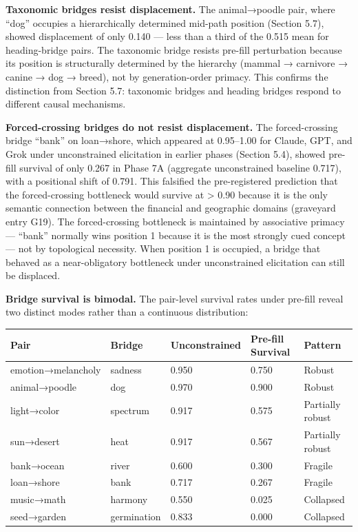 \textbf{Taxonomic bridges resist displacement.} The animal→poodle pair, where ``dog'' occupies a hierarchically determined mid-path position (Section 5.7), showed displacement of only 0.140 --- less than a third of the 0.515 mean for heading-bridge pairs. The taxonomic bridge resists pre-fill perturbation because its position is structurally determined by the hierarchy (mammal → carnivore → canine → dog → breed), not by generation-order primacy. This confirms the distinction from Section 5.7: taxonomic bridges and heading bridges respond to different causal mechanisms.

\textbf{Forced-crossing bridges do not resist displacement.} The forced-crossing bridge ``bank'' on loan→shore, which appeared at 0.95--1.00 for Claude, GPT, and Grok under unconstrained elicitation in earlier phases (Section 5.4), showed pre-fill survival of only 0.267 in Phase 7A (aggregate unconstrained baseline 0.717), with a positional shift of 0.791. This falsified the pre-registered prediction that the forced-crossing bottleneck would survive at \textgreater{} 0.90 because it is the only semantic connection between the financial and geographic domains (graveyard entry G19). The forced-crossing bottleneck is maintained by associative primacy --- ``bank'' normally wins position 1 because it is the most strongly cued concept --- not by topological necessity. When position 1 is occupied, a bridge that behaved as a near-obligatory bottleneck under unconstrained elicitation can still be displaced.

\textbf{Bridge survival is bimodal.} The pair-level survival rates under pre-fill reveal two distinct modes rather than a continuous distribution:

\begin{longtable}[]{@{}lllll@{}}
\toprule\noalign{}
Pair & Bridge & Unconstrained & Pre-fill Survival & Pattern \\
\midrule\noalign{}
\endhead
\bottomrule\noalign{}
\endlastfoot
emotion→melancholy & sadness & 0.950 & 0.750 & Robust \\
animal→poodle & dog & 0.970 & 0.900 & Robust \\
light→color & spectrum & 0.917 & 0.575 & Partially robust \\
sun→desert & heat & 0.917 & 0.567 & Partially robust \\
bank→ocean & river & 0.600 & 0.300 & Fragile \\
loan→shore & bank & 0.717 & 0.267 & Fragile \\
music→math & harmony & 0.550 & 0.025 & Collapsed \\
seed→garden & germination & 0.833 & 0.000 & Collapsed \\
\end{longtable}

